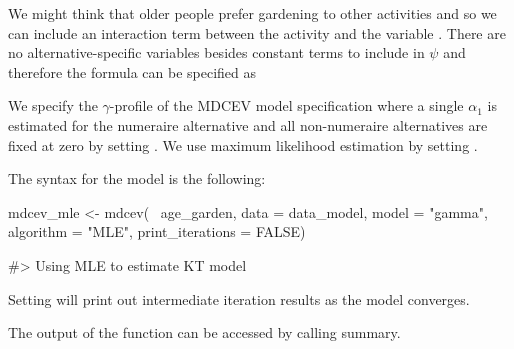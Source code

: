 We might think that older people prefer gardening to other activities
and so we can include an interaction term between the activity
 and the variable . There are no
alternative-specific variables besides constant terms to include in
\(\psi\) and therefore the formula can be specified as

\begin{Schunk}
\end{Schunk}

We specify the \(\gamma\)-profile of the MDCEV model specification where
a single \(\alpha_1\) is estimated for the numeraire alternative and all
non-numeraire alternatives are fixed at zero by setting
. We use maximum likelihood estimation by setting
.

The syntax for the model is the following:

\begin{Schunk}
\begin{Sinput}
mdcev_mle <- mdcev(~ age_garden,
                  data = data_model,
                  model = "gamma",
                  algorithm = "MLE",
                  print_iterations = FALSE)
\end{Sinput}
\begin{Soutput}
#> Using MLE to estimate KT model
\end{Soutput}
\end{Schunk}

Setting  will print out intermediate
iteration results as the model converges.

The output of the function can be accessed by calling summary.

